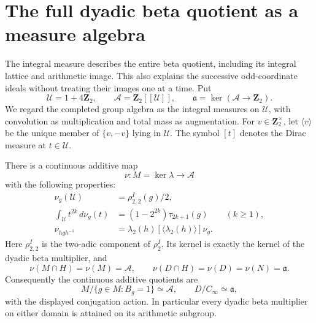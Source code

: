 \section{The full dyadic beta quotient as a measure algebra}
\label{sec:dyadic-beta-measure-algebra}

The integral measure describes the entire beta quotient, including its
integral lattice and arithmetic image. This also explains the successive
odd-coordinate ideals without treating their images one at a time.
Put
\[
 \mathcal U=1+4\mathbf Z_2,\qquad
 \mathcal A=\mathbf Z_2[[\mathcal U]],\qquad
 \mathfrak a=\ker(\mathcal A\longrightarrow\mathbf Z_2).
\]
We regard the completed group algebra as the integral measures on
$\mathcal U$, with convolution as multiplication and total mass as
augmentation. For $v\in\mathbf Z_2^\times$, let $\langle v\rangle$
be the unique member of $\{v,-v\}$ lying in $\mathcal U$.
The symbol $[t]$ denotes the Dirac measure at $t\in\mathcal U$.

\begin{theorem}\label{thm:full-dyadic-measure-algebra}
There is a continuous additive map
\[
 \nu:M=\ker\lambda\longrightarrow\mathcal A
\]
with the following properties:
\begin{align*}
 \nu_g(\mathcal U)&=\rho_{2,2}^I(g)/2,\\
 \int_{\mathcal U}t^{2k}\,d\nu_g(t)
   &=(1-2^{2k})\tau_{2k+1}(g)\qquad(k\ge1),\\
 \nu_{hgh^{-1}}&=\lambda_2(h)[\langle\lambda_2(h)\rangle]\nu_g.
\end{align*}
Here $\rho_{2,2}^I$ is the two-adic component of $\rho_2^I$.
Its kernel is exactly the kernel of the dyadic beta multiplier, and
\[
 \nu(M\cap H)=\nu(M)=\mathcal A,\qquad
 \nu(D\cap H)=\nu(D)=\nu(N)=\mathfrak a.
\]
Consequently the continuous additive quotients are
\[
 M/\{g\in M:B_g=1\}\simeq\mathcal A,\qquad
 D/C_\infty\simeq\mathfrak a,
\]
with the displayed conjugation action. In particular every dyadic beta
multiplier on either domain is attained on its arithmetic subgroup.
\end{theorem}

